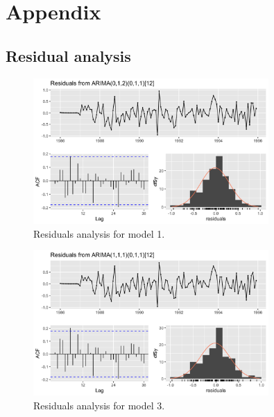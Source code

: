 \section*{Appendix}

\subsection*{Residual analysis}

\begin{figure}[H]
	\centering
	\includegraphics[width=0.8\textwidth]{figures/box_jenkins/residuals_analysis_model1.png}
	\caption{Residuals analysis for model 1.}
	\label{fig:residuals-analysis-model1}
\end{figure}

\begin{figure}[H]
	\centering
	\includegraphics[width=0.8\textwidth]{figures/box_jenkins/residuals_analysis_model3.png}
	\caption{Residuals analysis for model 3.}
	\label{fig:residuals-analysis-model3}
\end{figure}